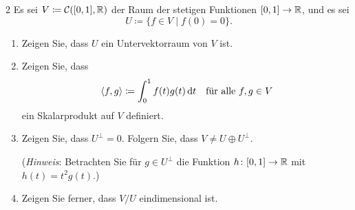 \begin{question}[subtitle = Ein $L^2$-Skalarprodukt und ein Gegenbeispiel im Unendlichdimensionalen]{2}
  \label{qst: counterexample with integral scalar product}
  Es sei $V \coloneqq \mathcal{C}([0,1], \mathbb{R})$ der Raum der stetigen Funktionen $[0,1] \to \mathbb{R}$, und es sei
  \[
    U \coloneqq \{ f \in V \mid f(0) = 0 \}.
  \]
  \begin{enumerate}[leftmargin=*]
    \item
      Zeigen Sie, dass $U$ ein Untervektorraum von $V$ ist.
    \item
      Zeigen Sie, dass
      \[
        \left\langle f, g \right\rangle \coloneqq \int_0^1 f(t) g(t) \,\text{d}t
        \quad
        \text{für alle $f, g \in V$}
      \]
      ein Skalarprodukt auf $V$ definiert.
    \item
      Zeigen Sie, dass $U^\perp = 0$.
      Folgern Sie, dass $V \neq U \oplus U^\perp$.
      
      (\emph{Hinweis}:
       Betrachten Sie für $g \in U^\perp$ die Funktion $h \colon [0,1] \to \mathbb{R}$ mit $h(t) = t^2 g(t)$.)
    \item
      Zeigen Sie ferner, dass $V\!/U$ eindimensional ist.
  \end{enumerate}
\end{question}


